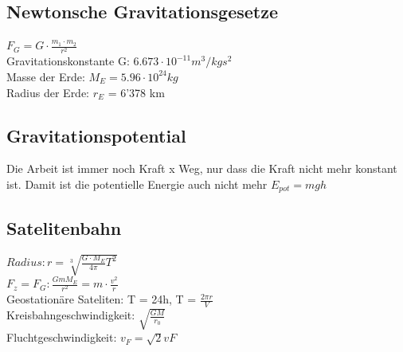 \begin{multicols}{2}
\subsection{Newtonsche Gravitationsgesetze}
$ F_G = G \cdot \frac{m_1 \cdot m_2}{r^2} $ \\
Gravitationskonstante G: $6.673 \cdot 10^{-11} m^3 / kg s^2$ \\
Masse der Erde: $M_E = 5.96 \cdot 10^{24} kg$ \\
Radius der Erde: $r_E$ = 6'378 km

\subsection{Gravitationspotential}
Die Arbeit ist immer noch Kraft x Weg, nur dass die Kraft nicht mehr konstant ist. Damit ist die potentielle Energie auch nicht mehr $E_{pot} = mgh$ 

\columnbreak
\subsection{Satelitenbahn}

$Radius: r = \sqrt[3]{\frac{G \cdot M_E}{4 \pi} T^2}$ \\
$F_z = F_G: \frac{G m M_E}{r^2} = m \cdot \frac{v^2}{r}$ \\
Geostationäre Sateliten: T = 24h, T = $\frac{2 \pi r}{V}$ \\
Kreisbahngeschwindigkeit: $\sqrt{\frac{GM}{r_0}}$\\
Fluchtgeschwindigkeit:  $v_F = \sqrt{2}vF$
\end{multicols}